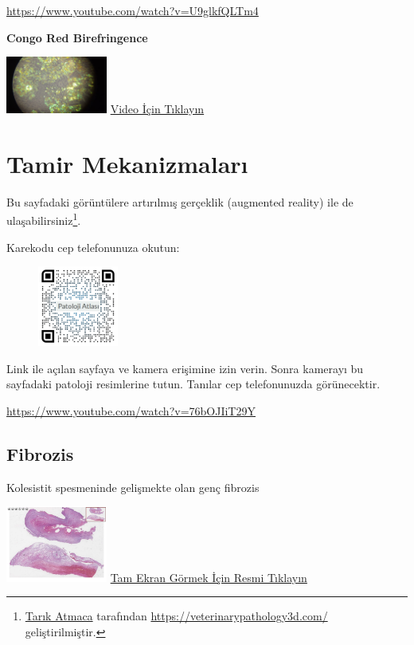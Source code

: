\documentclass[
  letterpaper,
  DIV=11,
  numbers=noendperiod]{scrreprt}
\begin{document}
\url{https://www.youtube.com/watch?v=U9glkfQLTm4}

\textbf{Congo Red Birefringence}

\href{https://www.youtube.com/watch?v=U9glkfQLTm4}{\includegraphics[width=0.25\textwidth,height=\textheight]{./screenshots/thumbnail_congored_video.png}}
\href{https://www.youtube.com/watch?v=U9glkfQLTm4}{Video İçin Tıklayın}

\hypertarget{sec-tamir-mekanizmalari}{%
\chapter{Tamir Mekanizmaları}\label{sec-tamir-mekanizmalari}}

Bu sayfadaki görüntülere artırılmış gerçeklik (augmented reality) ile de
ulaşabilirsiniz\footnote{\href{https://github.com/veterinarypathology3d}{Tarık
  Atmaca} tarafından \url{https://veterinarypathology3d.com/}
  geliştirilmiştir.}.

Karekodu cep telefonunuza okutun:

\begin{figure}

\includegraphics[width=1.04167in,height=\textheight]{images/AR-tamir.jpeg} \hfill{}

\end{figure}

Link ile açılan sayfaya ve kamera erişimine izin verin. Sonra kamerayı
bu sayfadaki patoloji resimlerine tutun. Tanılar cep telefonunuzda
görünecektir.

\url{https://www.youtube.com/watch?v=76bOJIiT29Y}

\hypertarget{sec-fibrozis}{%
\section{Fibrozis}\label{sec-fibrozis}}

Kolesistit spesmeninde gelişmekte olan genç fibrozis

\href{https://images.patolojiatlasi.com/fibrosis/HE.html}{\includegraphics[width=0.25\textwidth,height=\textheight]{./screenshots/thumbnail_fibrosis.png}}
\href{https://images.patolojiatlasi.com/fibrosis/HE.html}{Tam Ekran
Görmek İçin Resmi Tıklayın}
\end{document}
